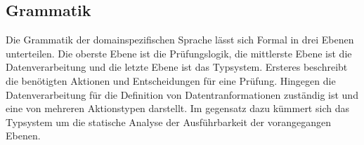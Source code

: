 \documentclass{article}
\begin{document}
    \subsection{Grammatik}
    \label{BNF}
    Die Grammatik der domainspezifischen Sprache lässt sich Formal in drei Ebenen unterteilen. 
    Die oberste Ebene ist die Prüfungslogik, die mittlerste Ebene ist die Datenverarbeitung und die letzte Ebene ist das Typsystem. \cite{99}
    Ersteres beschreibt die benötigten Aktionen und Entscheidungen für eine Prüfung. \cite{99}
    Hingegen die Datenverarbeitung für die Definition von Datentranformationen zuständig ist und eine von mehreren Aktionstypen darstellt. \cite{99}
    Im gegensatz dazu kümmert sich das Typsystem um die statische Analyse der Ausführbarkeit der vorangegangen Ebenen. \cite{99}
    
\end{document}
